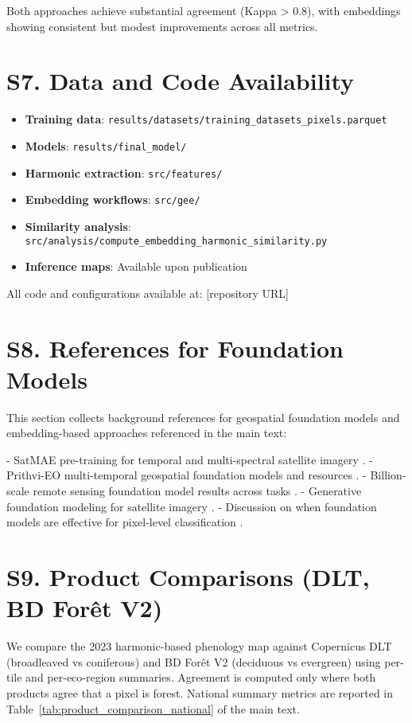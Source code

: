 \documentclass[utf8]{frontiers_suppmat}
\begin{document}
Both approaches achieve substantial agreement (Kappa > 0.8), with embeddings showing consistent but modest improvements across all metrics.

\section{S7. Data and Code Availability}

\begin{itemize}
    \item \textbf{Training data}: \texttt{results/datasets/training\_datasets\_pixels.parquet}
    \item \textbf{Models}: \texttt{results/final\_model/}
    \item \textbf{Harmonic extraction}: \texttt{src/features/}
    \item \textbf{Embedding workflows}: \texttt{src/gee/}
    \item \textbf{Similarity analysis}: \texttt{src/analysis/compute\_embedding\_harmonic\_similarity.py}
    \item \textbf{Inference maps}: Available upon publication
\end{itemize}

All code and configurations available at: [repository URL]

\section{S8. References for Foundation Models}

This section collects background references for geospatial foundation models and embedding-based approaches referenced in the main text:

- SatMAE pre-training for temporal and multi-spectral satellite imagery \citep{Cong2022}.
- Prithvi-EO multi-temporal geospatial foundation models and resources \citep{Szwarcman2024PrithviEO2}.
- Billion-scale remote sensing foundation model results across tasks \citep{Cha2023Billion}.
- Generative foundation modeling for satellite imagery \citep{Khanna2023DiffusionSat}.
- Discussion on when foundation models are effective for pixel-level classification \citep{Xie2024FoundationEffective}.

\section{S9. Product Comparisons (DLT, BD For\^et V2)}

We compare the 2023 harmonic-based phenology map against Copernicus DLT (broadleaved vs coniferous) and BD For\^et V2 (deciduous vs evergreen) using per-tile and per-eco-region summaries. Agreement is computed only where both products agree that a pixel is forest. National summary metrics are reported in Table~\ref{tab:product_comparison_national} of the main text.
\end{document}
